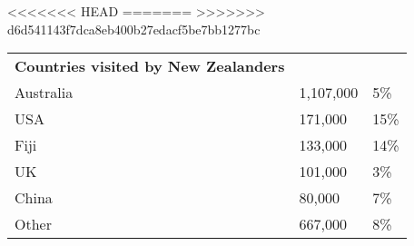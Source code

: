 <<<<<<< HEAD
=======
>>>>>>> d6d541143f7dca8eb400b27edacf5be7bb1277bc
\begin{tabular}[t]{p{4.7cm}>{\hfill}p{1.1cm}>{\hfill}p{1.7cm}}
 \textbf{Countries visited by New Zealanders} &   &   \\ 
 Australia & 1,107,000 & 5\% \\ 
  USA &   171,000 & 15\% \\ 
  Fiji &   133,000 & 14\% \\ 
  UK &   101,000 & 3\% \\ 
  China &    80,000 & 7\% \\ 
  Other &   667,000 & 8\% \\ 
  \end{tabular}

